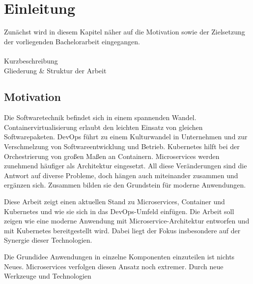 \section{Einleitung}

\vspace{1em} 
Zunächst wird in diesem Kapitel näher auf die Motivation sowie der Zielsetzung der vorliegenden Bachelorarbeit eingegangen.
\\
\\
{Kurzbeschreibung} \\
{Gliederung \& Struktur der Arbeit}


\subsection{Motivation}

Die Softwaretechnik befindet sich in einem spannenden Wandel. Containervirtualisierung erlaubt den leichten Einsatz von gleichen Softwarepaketen. DevOps führt zu einem Kulturwandel in Unternehmen und zur Verschmelzung von Softwareentwicklung und Betrieb. Kubernetes hilft bei der Orchestrierung von großen Maßen an Containern. Microservices werden zunehmend häufiger als Architektur eingesetzt. All diese Veränderungen sind die Antwort auf diverse Probleme, doch hängen auch miteinander zusammen und ergänzen sich. Zusammen bilden sie den Grundstein für moderne Anwendungen.

Diese Arbeit zeigt einen aktuellen Stand zu Microservices, Container und Kubernetes und wie sie sich in das DevOps-Umfeld einfügen. Die Arbeit soll zeigen wie eine moderne Anwendung mit Microservice-Architektur entworfen und mit Kubernetes bereitgestellt wird. Dabei liegt der Fokus insbesondere auf der Synergie dieser Technologien.

Die Grundidee Anwendungen in einzelne Komponenten einzuteilen ist nichts Neues. Microservices verfolgen diesen Ansatz noch extremer. Durch neue Werkzeuge und Technologien 

